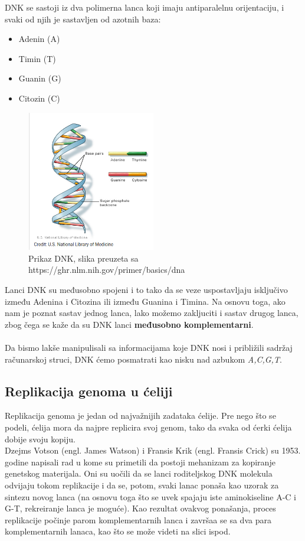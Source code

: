 DNK se sastoji iz dva polimerna lanca koji imaju antiparalelnu orijentaciju, i svaki od njih je sastavljen od azotnih baza:
\begin{itemize}
	\item Adenin (A)
	\item Timin (T)
	\item Guanin (G)
	\item Citozin (C)
\end{itemize}

\begin{figure}[h]
\caption{Prikaz DNK, slika preuzeta sa https://ghr.nlm.nih.gov/primer/basics/dna}
\centering
\includegraphics[width=0.5\textwidth]{poglavlja/1/slike/DNK.png}
\end{figure} 

Lanci DNK su međusobno spojeni i to tako da se veze uspostavljaju isključivo između Adenina i Citozina ili između Guanina i Timina. Na osnovu toga, ako nam je poznat sastav jednog lanca, lako možemo zakljuciti i sastav drugog lanca, zbog čega se kaže da su DNK lanci \textbf{međusobno komplementarni}.\\\\
Da bismo lakše manipulisali sa informacijama koje DNK nosi i približili sadržaj računarskoj struci, DNK ćemo posmatrati kao nisku nad azbukom \textit{A,C,G,T}.

\subsection{Replikacija genoma u ćeliji}
Replikacija genoma je jedan od najvažnijih zadataka ćelije. Pre nego što se podeli, ćelija mora da najpre replicira svoj genom, tako da svaka od ćerki ćelija dobije svoju kopiju. \\
Dzejms Votson (engl. James Watson) i Fransis Krik (engl. Fransis Crick) su 1953. godine napisali rad u kome su primetili da postoji mehanizam za kopiranje genetskog materijala. Oni su uočili da se lanci roditeljskog DNK molekula odvijaju tokom replikacije i da se, potom, svaki lanac ponaša kao uzorak za sintezu novog lanca (na osnovu toga što se uvek spajaju iste aminokiseline A-C i G-T, rekreiranje lanca je moguće). Kao rezultat ovakvog ponašanja, proces replikacije počinje parom komplementarnih lanca i završaa se sa dva para komplementarnih lanaca, kao što se može videti na slici ispod.

